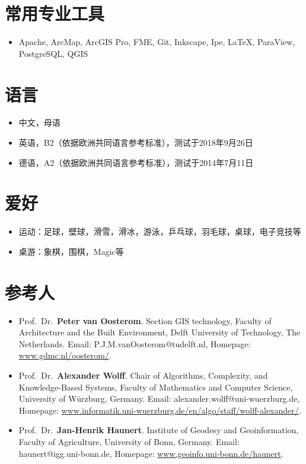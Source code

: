 \documentclass{resume}
\begin{document}
\section{常用专业工具}
\begin{itemize}[parsep=0ex]
\item Apache, ArcMap, ArcGIS Pro, FME, Git, Inkscape, Ipe, 
    LaTeX, ParaView, PostgreSQL, QGIS
\end{itemize}

\section{语言}
\begin{itemize}[parsep=0ex]
\item 中文，母语
\item 英语，B2（依据欧洲共同语言参考标准），测试于2018年9月26日
\item 德语，A2（依据欧洲共同语言参考标准），测试于2014年7月11日
\end{itemize}

\section{爱好}
\begin{itemize}[parsep=0ex]
\item 运动：足球，壁球，滑雪，滑冰，游泳，乒乓球，羽毛球，桌球，电子竞技等
\item 桌游：象棋，围棋，Magic等
\end{itemize}

\section{参考人}
\begin{itemize}[parsep=1ex]

\item Prof.\ Dr.\ \textbf{Peter van Oosterom}.
	Section GIS technology,
	Faculty of Architecture and the Built Environment, 
	Delft University of Technology, The Netherlands.
	Email: P.J.M.vanOosterom@tudelft.nl,
	Homepage: \url{www.gdmc.nl/oosterom/}.

\item Prof.\ Dr.\ \textbf{Alexander Wolff}.
	Chair of Algorithms, Complexity, and Knowledge-Based Systems,
	Faculty of Mathematics and Computer Science, 
	University of W\"urzburg, Germany.
	Email: alexander.wolff@uni-wuerzburg.de,
	Homepage: \url{www.informatik.uni-wuerzburg.de/en/algo/staff/wolff-alexander/}.   

\item Prof.\ Dr.\ \textbf{Jan-Henrik Haunert}. 
	Institute of Geodesy and Geoinformation,
    Faculty of Agriculture,
	University of Bonn, Germany.
	Email: haunert@igg.uni-bonn.de,
	Homepage: \url{www.geoinfo.uni-bonn.de/haunert}.

\end{itemize}
   
\end{document}
